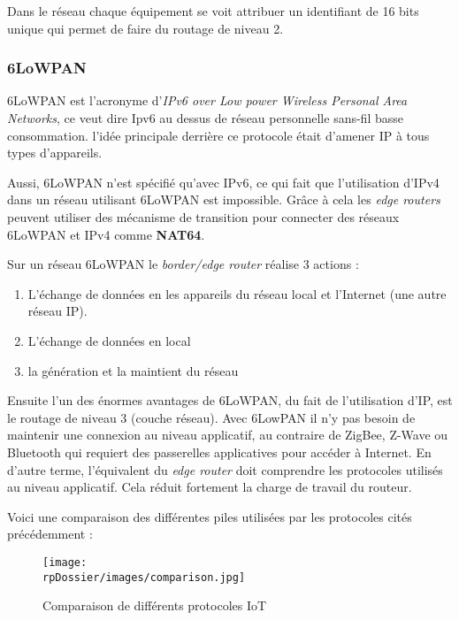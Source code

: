 Dans le réseau chaque équipement se voit attribuer un identifiant de 16 bits unique qui permet de faire du routage de niveau 2.

\subsubsection{6LoWPAN}

6LoWPAN est l'acronyme d'\textit{IPv6 over Low power Wireless Personal Area Networks}, ce veut dire Ipv6 au dessus de réseau personnelle sans-fil basse consommation. l'idée principale derrière ce protocole était d'amener IP à tous types d'appareils. 

Aussi, 6LoWPAN n'est spécifié qu'avec IPv6, ce qui fait que l'utilisation d'IPv4 dans un réseau utilisant 6LoWPAN est impossible. Grâce à cela les \textit{edge routers} peuvent utiliser des mécanisme de transition pour connecter des réseaux 6LoWPAN et IPv4 comme \textbf{NAT64}.

Sur un réseau 6LoWPAN le \textit{border/edge router} réalise 3 actions :

\begin{enumerate}
\item L'échange de données en les appareils du réseau local et l'Internet (une autre réseau IP).
\item L'échange de données en local
\item la génération et la maintient du réseau
\end{enumerate}

Ensuite l'un des énormes avantages de 6LoWPAN, du fait de l'utilisation d'IP, est le routage de niveau 3 (couche réseau). Avec 6LowPAN il n'y pas besoin de maintenir une connexion au niveau applicatif, au contraire de ZigBee, Z-Wave ou Bluetooth qui requiert des passerelles applicatives pour accéder à Internet. En d'autre terme, l'équivalent du \textit{edge router} doit comprendre les protocoles utilisés au niveau applicatif. Cela réduit fortement la charge de travail du routeur.

Voici une comparaison des différentes piles utilisées par les protocoles cités précédemment : 

\begin{figure}[H]
\centering
\texttt{[image: \\rpDossier/images/comparison.jpg]}
\caption{Comparaison de différents protocoles IoT}
\label{comparison}
\end{figure}


